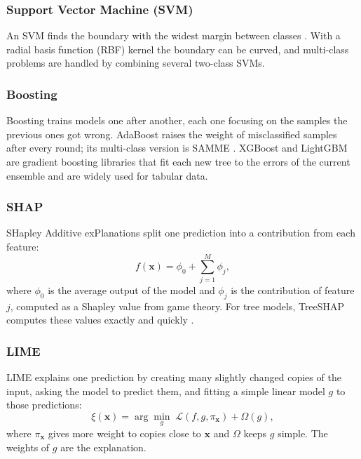 \documentclass[conference]{IEEEtran}
\begin{document}
\subsubsection{Support Vector Machine (SVM)}
An SVM finds the boundary with the widest margin between classes \cite{cortes1995}. With a radial basis function (RBF) kernel the boundary can be curved, and multi-class problems are handled by combining several two-class SVMs.

\subsubsection{Boosting}
Boosting trains models one after another, each one focusing on the samples the previous ones got wrong. AdaBoost \cite{freund1997} raises the weight of misclassified samples after every round; its multi-class version is SAMME \cite{zhu2009}. XGBoost \cite{chen2016} and LightGBM \cite{ke2017} are gradient boosting libraries that fit each new tree to the errors of the current ensemble and are widely used for tabular data.

\subsubsection{SHAP}
SHapley Additive exPlanations \cite{lundberg2017} split one prediction into a contribution from each feature:
\begin{equation}
f(\mathbf{x}) = \phi_0 + \sum_{j=1}^{M} \phi_j,
\end{equation}
where $\phi_0$ is the average output of the model and $\phi_j$ is the contribution of feature $j$, computed as a Shapley value from game theory. For tree models, TreeSHAP computes these values exactly and quickly \cite{lundberg2020}.

\subsubsection{LIME}
LIME \cite{ribeiro2016} explains one prediction by creating many slightly changed copies of the input, asking the model to predict them, and fitting a simple linear model $g$ to those predictions:
\begin{equation}
\xi(\mathbf{x}) = \arg\min_{g} \; \mathcal{L}(f, g, \pi_{\mathbf{x}}) + \Omega(g),
\end{equation}
where $\pi_{\mathbf{x}}$ gives more weight to copies close to $\mathbf{x}$ and $\Omega$ keeps $g$ simple. The weights of $g$ are the explanation.
\end{document}
